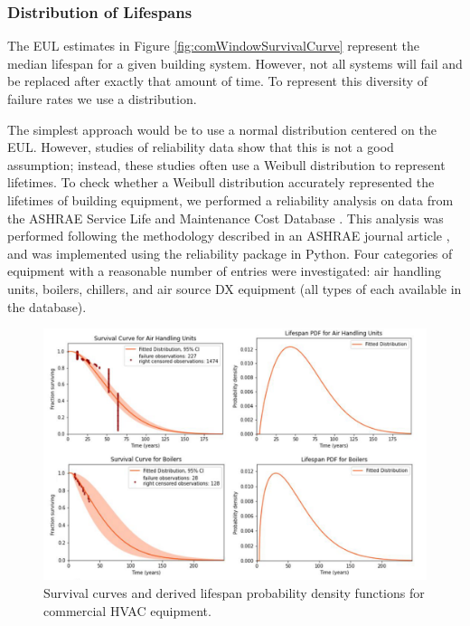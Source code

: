 \subsubsection{Distribution of Lifespans}
The EUL estimates in Figure \ref{fig:comWindowSurvivalCurve} represent the median lifespan for a given building system. However, not all systems will fail and be replaced after exactly that amount of time. To represent this diversity of failure rates we use a distribution.

\par
The simplest approach would be to use a normal distribution centered on the EUL. However, studies of reliability data show that this is not a good assumption; instead, these studies often use a Weibull distribution to represent lifetimes. To check whether a Weibull distribution accurately represented the lifetimes of building equipment, we performed a reliability analysis on data from the ASHRAE Service Life and Maintenance Cost Database \citep{ashrae_reliability_db}. This analysis was performed following the methodology described in an ASHRAE journal article \citep{determine_equip_life}, and was implemented using the reliability package \citep{matthew_reid_2020_3938000} in Python. Four categories of equipment with a reasonable number of entries were investigated: air handling units, boilers, chillers, and air source DX equipment (all types of each available in the database).

\begin{figure} [h!]
\includegraphics[width=\textwidth]{figures/ashrae_equip_lifespans2.png}
\centering
\caption[Survival curves and derived lifespan probability density functions for HVAC equipment]{Survival curves and derived lifespan probability density functions for commercial HVAC equipment.}
\label{fig:hvac_survival_curves}
\end{figure}

